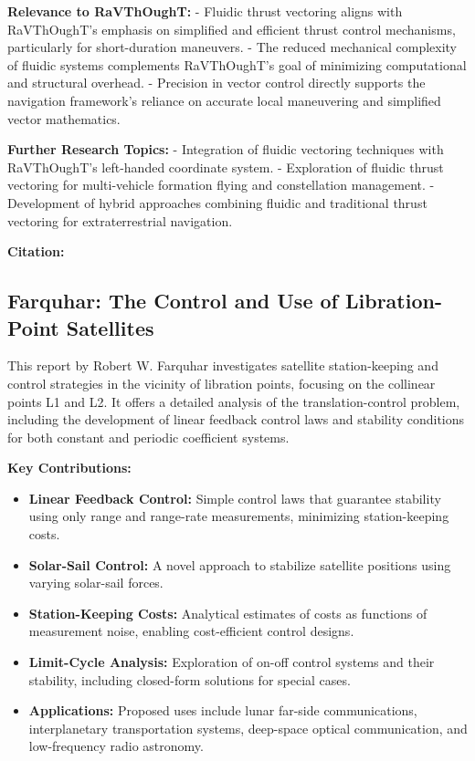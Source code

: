 \textbf{Relevance to RaVThOughT:}
- Fluidic thrust vectoring aligns with RaVThOughT's emphasis on simplified and efficient thrust control mechanisms, particularly for short-duration maneuvers.
- The reduced mechanical complexity of fluidic systems complements RaVThOughT’s goal of minimizing computational and structural overhead.
- Precision in vector control directly supports the navigation framework's reliance on accurate local maneuvering and simplified vector mathematics.

\textbf{Further Research Topics:}
- Integration of fluidic vectoring techniques with RaVThOughT's left-handed coordinate system.
- Exploration of fluidic thrust vectoring for multi-vehicle formation flying and constellation management.
- Development of hybrid approaches combining fluidic and traditional thrust vectoring for extraterrestrial navigation.

\textbf{Citation:} 

\subsection{Farquhar: The Control and Use of Libration-Point Satellites}

This report by Robert W. Farquhar investigates satellite station-keeping and control strategies in the vicinity of libration points, focusing on the collinear points L1 and L2. It offers a detailed analysis of the translation-control problem, including the development of linear feedback control laws and stability conditions for both constant and periodic coefficient systems.

\textbf{Key Contributions:}
\begin{itemize}
    \item \textbf{Linear Feedback Control:} Simple control laws that guarantee stability using only range and range-rate measurements, minimizing station-keeping costs.
    \item \textbf{Solar-Sail Control:} A novel approach to stabilize satellite positions using varying solar-sail forces.
    \item \textbf{Station-Keeping Costs:} Analytical estimates of costs as functions of measurement noise, enabling cost-efficient control designs.
    \item \textbf{Limit-Cycle Analysis:} Exploration of on-off control systems and their stability, including closed-form solutions for special cases.
    \item \textbf{Applications:} Proposed uses include lunar far-side communications, interplanetary transportation systems, deep-space optical communication, and low-frequency radio astronomy.
\end{itemize}

